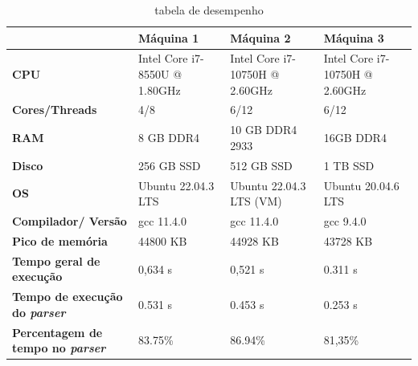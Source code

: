 \documentclass[12pt,a4paper]{report}
\begin{document}
\begin{table}[htbp]
    \begin{center}
    \begin{tabular}{|p{3cm}|p{4cm}|p{4cm}|p{4cm}|}
    \hline
                                           & \textbf{Máquina 1} &                        \textbf{Máquina 2} &                       \textbf{Máquina 3} \\ \hline
    \textbf{CPU}            & Intel Core i7-8550U  @ 1.80GHz            & Intel Core i7-10750H @ 2.60GHz                 & Intel Core i7-10750H @ 2.60GHz\\ \hline
    \textbf{Cores/Threads}                    & 4/8                                          & 6/12                                  & 6/12\\ \hline
    \textbf{RAM}                              & 8 GB DDR4                                    & 10 GB DDR4 2933                       & 16GB DDR4\\ \hline
    \textbf{Disco}                            & 256 GB SSD                                   & 512 GB SSD                            & 1 TB SSD\\ \hline
    \textbf{OS}                               & Ubuntu 22.04.3 LTS                           & Ubuntu 22.04.3 LTS (VM)                    & Ubuntu 20.04.6 LTS\\ \hline
    \textbf{Compilador/ Versão}               & gcc 11.4.0                                   & gcc 11.4.0                     & gcc 9.4.0 \\ \hline
    \textbf{Pico de memória}                  & 44800 KB                                     & 44928 KB                              & 43728 KB\\ \hline
    \textbf{Tempo geral de execução}      & 0,634 s                                   & 0,521 s                            & 0.311 s\\ \hline
    \textbf{Tempo de execução do \textit{parser}} & 0.531 s                            & 0.453 s                                  & 0.253 s \\ \hline
    \textbf{Percentagem de tempo no \textit{parser}} & 83.75\%                          & 86.94\%                                 &  81,35\%        \\ \hline
    \end{tabular}
    \end{center}
    \caption{tabela de desempenho}
    \label{tab:exemplo2}
\end{table}
\end{document}
